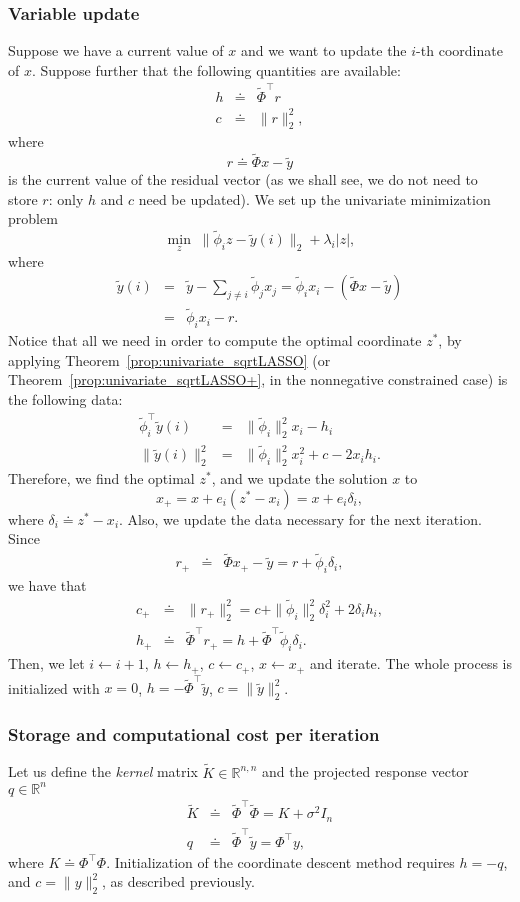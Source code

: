 \documentclass[11pt]{article}
\newcommand{\tran}{^{\top}}
\newcommand{\lam}{\lambda}
\newcommand{\beas}{\begin{eqnarray*}}
\newcommand{\eeas}{\end{eqnarray*}}
\newcommand{\Real}[1]{ { {\mathbb R}^{#1} } }
\begin{document}
\subsubsection{Variable update}
Suppose we have a current value of $x$ 
and we want to update the $i$-th coordinate of $x$. Suppose further that the following quantities are available:
\beas
h &\doteq & \tilde\Phi \tran r  \\
c &\doteq & \|r\|_2^2,
\eeas
where 
\[
r \doteq \tilde\Phi x -\tilde y
\]
is the current value of the residual vector (as we shall see, we do not need to store $r$: only $h$ and $c$ need be updated).
We set up the univariate minimization problem
\[
\min_{z}\; \|\tilde\phi_i z - \tilde y(i)\|_2 + \lam_i |z|,
\] 
where 
\beas
\tilde y(i) &=& \tilde y -\sum_{j\neq i} \tilde\phi_j x_j = \tilde \phi_i x_i - (\tilde\Phi x-\tilde y) \\
&=& \tilde \phi_i x_i - r.
\eeas
Notice that  all we need in order to compute the optimal coordinate $z^*$, by applying Theorem~\ref{prop:univariate_sqrtLASSO} (or Theorem~\ref{prop:univariate_sqrtLASSO+}, in the nonnegative constrained case) is the following data:
\beas
\tilde\phi_i\tran \tilde y(i) &=& \|\tilde \phi_i\|_2^2 x_i - h_i\\
\|\tilde y(i) \|_2^2 &=& \|\tilde \phi_i\|_2^2 x_i^2 + c - 2x_i h_i.
\eeas
 Therefore, we find the optimal $z^*$, and we update the solution $x$ to
\[
x_+ = x + e_i (z^*-x_i) =  x + e_i \delta_i,
\]
where $\delta_i \doteq z^*-x_i$. Also, we update the data necessary for the next iteration. Since
\beas
r_+ &\doteq &  \tilde \Phi x_+ -\tilde y  = r + \tilde\phi_i\delta_i,
\eeas
we have that
\beas
c_+ &\doteq & \|r_+\|_2^2 = c + \|\tilde\phi_i\|_2^2\delta_i^2 + 2\delta_i h_i, \\
h_+ &\doteq & \tilde\Phi \tran r_+ =  h + \tilde\Phi \tran \tilde\phi_i\delta_i.
\eeas
Then, we let $i\gets i+1$,  $h\gets h_+$, $c\gets c_+$, $x\gets x_+$ and iterate.
The whole process is initialized with $x = 0$, $h=-\tilde\Phi\tran\tilde y$, $c=\|\tilde y\|_2^2$.

\subsubsection{Storage and computational cost per iteration}
Let us define the {\em kernel} matrix $\tilde K\in\Real{n,n}$ and the projected response vector $ q\in\Real{n}$
\beas
\tilde K &\doteq & \tilde\Phi\tran \tilde \Phi  = K + \sigma^2 I_n \\
 q &\doteq & \tilde\Phi\tran \tilde y  = \Phi\tran y,
\eeas
where
$
K \doteq \Phi\tran \Phi
$.
Initialization of the  coordinate descent method  requires
$h = -q$, and $c=\|y\|_2^2$, as described previously. 
\end{document}

